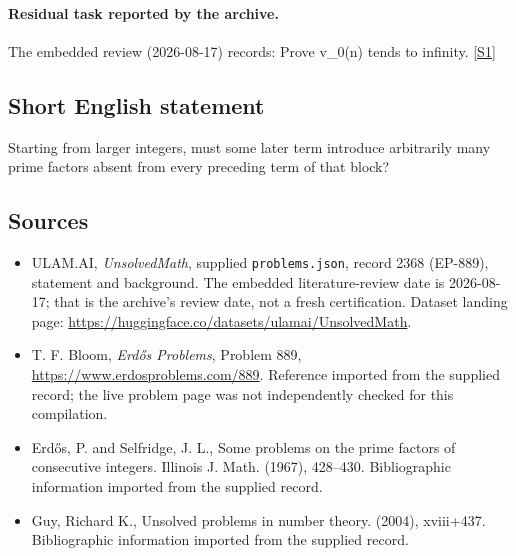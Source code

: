 \documentclass[11pt,a4paper]{article}
\newcommand{\sref}[2]{\hyperlink{source:#1:#2}{[S#2]}}
\begin{document}
\paragraph{Residual task reported by the archive.}

The embedded review (2026-08-17) records: Prove v\_0(n) tends to infinity. \sref{2368}{1}

\subsection{Short English statement}

Starting from larger integers, must some later term introduce arbitrarily many prime factors absent from every preceding term of that block?

\subsection{Sources}

{\small

\begin{itemize}

\item[\hypertarget{source:2368:1}{S1}] ULAM.AI, \emph{UnsolvedMath}, supplied \texttt{problems.json}, record 2368 (EP-889), statement and background. The embedded literature-review date is 2026-08-17; that is the archive’s review date, not a fresh certification. Dataset landing page: \url{https://huggingface.co/datasets/ulamai/UnsolvedMath}.

\item[\hypertarget{source:2368:2}{S2}] T. F. Bloom, \emph{Erdős Problems}, Problem 889, \url{https://www.erdosproblems.com/889}. Reference imported from the supplied record; the live problem page was not independently checked for this compilation.

\item[\hypertarget{source:2368:3}{S3}] Erd\H{o}s, P. and Selfridge, J. L., Some problems on the prime factors of consecutive integers. Illinois J. Math. (1967), 428--430. Bibliographic information imported from the supplied record.

\item[\hypertarget{source:2368:4}{S4}] Guy, Richard K., Unsolved problems in number theory. (2004), xviii+437. Bibliographic information imported from the supplied record.

\end{itemize}

}

\label{end:2368}
\end{document}
